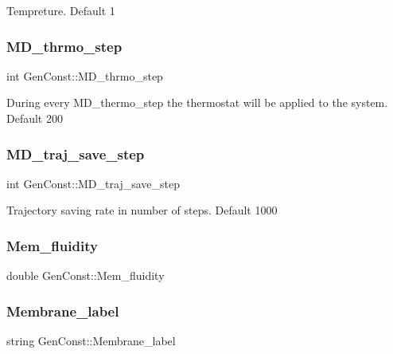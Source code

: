 Tempreture. Default 1 \mbox{\label{namespaceGenConst_a56bcad4f77ee68b9b821e6770faa0919}} 
\subsubsection{\texorpdfstring{MD\_thrmo\_step}{MD\_thrmo\_step}}
{\footnotesize\ttfamily int Gen\+Const\+::\+M\+D\+\_\+thrmo\+\_\+step}

During every \textquotesingle{}M\+D\+\_\+thermo\+\_\+step\textquotesingle{} the thermostat will be applied to the system. Default 200 \mbox{\label{namespaceGenConst_aaa51b4cdf7be8e16996b1899f08a19bc}} 
\subsubsection{\texorpdfstring{MD\_traj\_save\_step}{MD\_traj\_save\_step}}
{\footnotesize\ttfamily int Gen\+Const\+::\+M\+D\+\_\+traj\+\_\+save\+\_\+step}

Trajectory saving rate in number of steps. Default 1000 \mbox{\label{namespaceGenConst_a35fca1b123cae57a3f8f6de82e02f553}} 
\subsubsection{\texorpdfstring{Mem\_fluidity}{Mem\_fluidity}}
{\footnotesize\ttfamily double Gen\+Const\+::\+Mem\+\_\+fluidity}

\mbox{\label{namespaceGenConst_acefa162cfa7572ce261245beaa812c9b}} 
\subsubsection{\texorpdfstring{Membrane\_label}{Membrane\_label}}
{\footnotesize\ttfamily string Gen\+Const\+::\+Membrane\+\_\+label}


